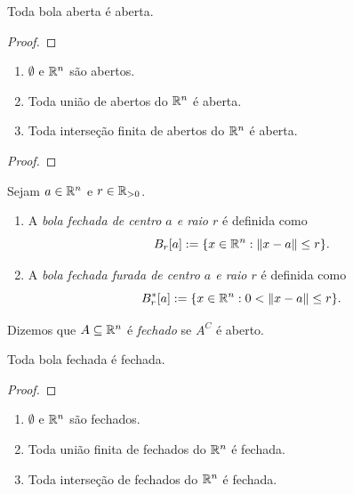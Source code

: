 \begin{corollary}
    Toda bola aberta é aberta.
\end{corollary}

\begin{proof}
    \blackproof
\end{proof}

\begin{theorem}
    \leavevmode
        \begin{enumerate}[leftmargin=*, align=left, label=\textbf{(\alph*)}]
            \item $\emptyset$ e $\mathbb{R}^n$ são abertos.
            \item Toda união de abertos do $\mathbb{R}^n$ é aberta.
            \item Toda interseção finita de abertos do $\mathbb{R}^n$ é aberta.
        \end{enumerate}
\end{theorem}

\begin{proof}
\end{proof}

\begin{definition}
    Sejam $a \in \mathbb{R}^n$ e $r \in \mathbb{R}_{>0}$.
        \begin{enumerate}[leftmargin=*, align=left, label=\textbf{(\alph*)}]
            \item A \emph{bola fechada de centro $a$ e raio $r$} é definida como
                \[
                    B_r[a] := \{x \in \mathbb{R}^n : \|x-a\| \leq r\}.
                \]
            \item A \emph{bola fechada furada de centro $a$ e raio $r$} é definida como
                \[
                    B^*_r[a] := \{x \in \mathbb{R}^n : 0 < \|x-a\| \leq r\}.
                \]
        \end{enumerate}
\end{definition}

\begin{definition}
    Dizemos que $A \subseteq \mathbb{R}^n$ é \emph{fechado} se $A^C$ é aberto.
\end{definition}

\begin{corollary}
    Toda bola fechada é fechada.
\end{corollary}

\begin{proof}
    \blackproof
\end{proof}

\begin{theorem}
    \leavevmode
        \begin{enumerate}[leftmargin=*, align=left, label=\textbf{(\alph*)}]
            \item $\emptyset$ e $\mathbb{R}^n$ são fechados.
            \item Toda união finita de fechados do $\mathbb{R}^n$ é fechada.
            \item Toda interseção de fechados do $\mathbb{R}^n$ é fechada.
        \end{enumerate}
\end{theorem}

